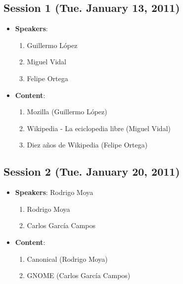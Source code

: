 \documentclass[a4paper]{article}
\begin{document}
\subsection{Session 1 (Tue. January 13, 2011)}

\begin{itemize}
 \item \textbf{Speakers}:

  \begin{enumerate}
   \item Guillermo López
   \item Miguel Vidal
   \item Felipe Ortega
  \end{enumerate}

 \item \textbf{Content}:

  \begin{enumerate}
   \item Mozilla (Guillermo López)
   \item Wikipedia - La eciclopedia libre (Miguel Vidal)
   \item Diez años de Wikipedia (Felipe Ortega)
  \end{enumerate}

\end{itemize}

\subsection{Session 2 (Tue. January 20, 2011)}

\begin{itemize}
 \item \textbf{Speakers}: Rodrigo Moya

  \begin{enumerate}
   \item Rodrigo Moya
   \item Carlos García Campos
  \end{enumerate}

 \item \textbf{Content}:

  \begin{enumerate}
   \item Canonical (Rodrigo Moya)
   \item GNOME (Carlos García Campos)
  \end{enumerate}

\end{itemize}
\end{document}
